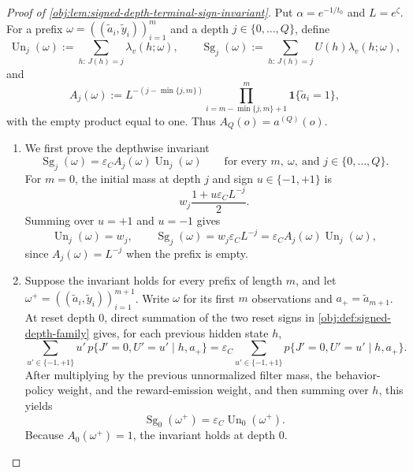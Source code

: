 \documentclass[11pt]{article}
\begin{document}
\begin{proof}[Proof of \cref{obj:lem:signed-depth-terminal-sign-invariant}]
Put \(\alpha=e^{-1/t_0}\) and \(L=e^\zeta\).  For a prefix
\(\omega=((\tilde a_i,\tilde y_i))_{i=1}^m\) and a depth
\(j\in\{0,\ldots,Q\}\), define
\[
\operatorname{Un}_j(\omega)
:=
\sum_{h:\,J(h)=j}\lambda_v(h;\omega),
\qquad
\operatorname{Sg}_j(\omega)
:=
\sum_{h:\,J(h)=j}U(h)\lambda_v(h;\omega),
\]
and
\[
A_j(\omega)
:=
L^{-(j-\min\{j,m\})}
\prod_{i=m-\min\{j,m\}+1}^{m}\mathbf 1\{\tilde a_i=1\},
\]
with the empty product equal to one.  Thus \(A_Q(o)=a^{(Q)}(o)\).

\begin{enumerate}
\item We first prove the depthwise invariant
\[
\operatorname{Sg}_j(\omega)
=
\varepsilon_C A_j(\omega)\operatorname{Un}_j(\omega)
\qquad
\text{for every }m,\ \omega,\ \text{and }j\in\{0,\ldots,Q\}.
\]
For \(m=0\), the initial mass at depth \(j\) and sign \(u\in\{-1,+1\}\) is
\[
w_j\frac{1+u\varepsilon_C L^{-j}}{2}.
\]
Summing over \(u=+1\) and \(u=-1\) gives
\[
\operatorname{Un}_j(\omega)=w_j,
\qquad
\operatorname{Sg}_j(\omega)
=
w_j\varepsilon_C L^{-j}
=
\varepsilon_C A_j(\omega)\operatorname{Un}_j(\omega),
\]
since \(A_j(\omega)=L^{-j}\) when the prefix is empty.

\item Suppose the invariant holds for every prefix of length \(m\), and let
\(\omega^+=((\tilde a_i,\tilde y_i))_{i=1}^{m+1}\).  Write \(\omega\) for its first \(m\) observations and \(a_+=\tilde a_{m+1}\).  At reset depth \(0\), direct summation of the two reset signs in \cref{obj:def:signed-depth-family} gives, for each previous hidden state \(h\),
\[
\sum_{u'\in\{-1,+1\}}
u'\,p\{J'=0,U'=u'\mid h,a_+\}
=
\varepsilon_C
\sum_{u'\in\{-1,+1\}}
p\{J'=0,U'=u'\mid h,a_+\}.
\]
After multiplying by the previous unnormalized filter mass, the behavior-policy weight, and the reward-emission weight, and then summing over \(h\), this yields
\[
\operatorname{Sg}_0(\omega^+)
=
\varepsilon_C\operatorname{Un}_0(\omega^+).
\]
Because \(A_0(\omega^+)=1\), the invariant holds at depth \(0\).


\end{enumerate}
\end{proof}
\end{document}
